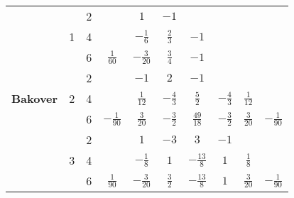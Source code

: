 \begin{table}[H]
\begin{tabular}{|c|c|c|c|c|c|c|c|c|c|}
        \multirow{12}{*}{\textbf{\footnotesize{Bakover}}}
                                                          & \multirow{3}{*}{1}           & 2                           &                  & $1$              & $-1$            &                  &                   &                    &                  \\ \cline{3-10}
                                                          &                              & 4                           &                  & $-\frac{1}{6}$   & $\frac{2}{3}$   & $-1$             &                   &                    &                  \\ \cline{3-10}
                                                          &                              & 6                           & $\frac{1}{60}$   & $-\frac{3}{20}$  & $\frac{3}{4}$   & $-1$             &                   &                    &                  \\ \cline{2-10}
                                                          & \multirow{3}{*}{2}           & 2                           &                  & $-1$             & $2$             & $-1$             &                   &                    &                  \\ \cline{3-10}
                                                          &                              & 4                           &                  & $\frac{1}{12}$   & $-\frac{4}{3}$  & $\frac{5}{2}$    & $-\frac{4}{3}$    & $\frac{1}{12}$     &                  \\ \cline{3-10}
                                                          &                              & 6                           & $-\frac{1}{90}$  & $\frac{3}{20}$   & $-\frac{3}{2}$  & $\frac{49}{18}$  & $-\frac{3}{2}$    & $\frac{3}{20}$     & $-\frac{1}{90}$  \\ \cline{2-10}
                                                          & \multirow{3}{*}{3}           & 2                           &                  & $1$              & $-3$            & $3$              & $-1$              &                    &                  \\ \cline{3-10}
                                                          &                              & 4                           &                  & $-\frac{1}{8}$   & $1$             & $-\frac{13}{8}$  & $1$               & $\frac{1}{8}$      &                  \\ \cline{3-10}
                                                          &                              & 6                           & $\frac{1}{90}$   & $-\frac{3}{20}$  & $\frac{3}{2}$   & $-\frac{13}{8}$  & $1$               & $\frac{3}{20}$     & $-\frac{1}{90}$  \\ \cline{2-10}

\end{tabular}
\end{table}
